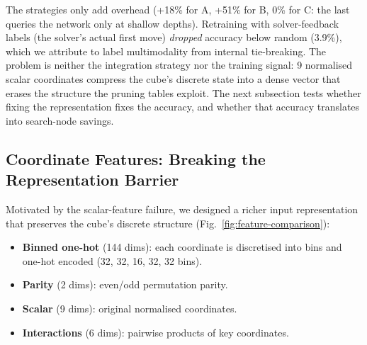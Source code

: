 \documentclass[graybox]{svmult}
\begin{document}
The strategies only add overhead (+18\% for A, +51\% for B, 0\% for C: the last queries the network only at shallow depths). Retraining with solver-feedback labels (the solver's actual first move) \emph{dropped} accuracy below random (3.9\%), which we attribute to label multimodality from internal tie-breaking. The problem is neither the integration strategy nor the training signal: 9 normalised scalar coordinates compress the cube's discrete state into a dense vector that erases the structure the pruning tables exploit. The next subsection tests whether fixing the representation fixes the accuracy, and whether that accuracy translates into search-node savings.

\subsection{Coordinate Features: Breaking the Representation Barrier}
\label{sec:coord-features}

Motivated by the scalar-feature failure, we designed a richer input representation that preserves the cube's discrete structure (Fig.~\ref{fig:feature-comparison}):

\begin{itemize}[leftmargin=*]
  \item \textbf{Binned one-hot} (144 dims): each coordinate is discretised into bins and one-hot encoded (32, 32, 16, 32, 32 bins).
  \item \textbf{Parity} (2 dims): even/odd permutation parity.
  \item \textbf{Scalar} (9 dims): original normalised coordinates.
  \item \textbf{Interactions} (6 dims): pairwise products of key coordinates.
\end{itemize}
\end{document}
